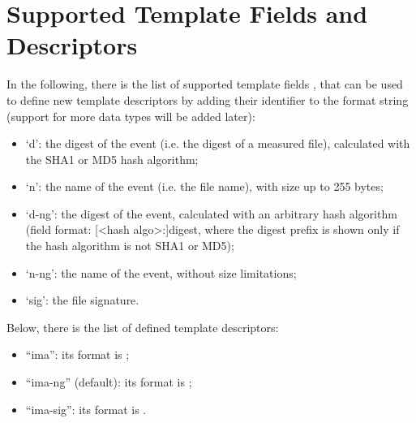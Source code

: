 \documentclass[a4paper,8pt,english]{sphinxmanual}
\begin{document}
\section{Supported Template Fields and Descriptors}
\label{security/IMA-templates:supported-template-fields-and-descriptors}
In the following, there is the list of supported template fields
, that can be used to define new template
descriptors by adding their identifier to the format string
(support for more data types will be added later):
\begin{itemize}
\item {} 
`d': the digest of the event (i.e. the digest of a measured file),
calculated with the SHA1 or MD5 hash algorithm;

\item {} 
`n': the name of the event (i.e. the file name), with size up to 255 bytes;

\item {} 
`d-ng': the digest of the event, calculated with an arbitrary hash
algorithm (field format: {[}\textless{}hash algo\textgreater{}:{]}digest, where the digest
prefix is shown only if the hash algorithm is not SHA1 or MD5);

\item {} 
`n-ng': the name of the event, without size limitations;

\item {} 
`sig': the file signature.

\end{itemize}

Below, there is the list of defined template descriptors:
\begin{itemize}
\item {} 
``ima'': its format is ;

\item {} 
``ima-ng'' (default): its format is ;

\item {} 
``ima-sig'': its format is .

\end{itemize}
\end{document}
